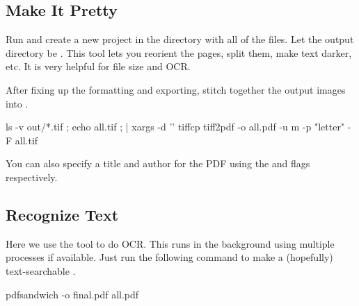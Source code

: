\subsection{Make It Pretty}

Run  and create a new project in the directory with all of the  files.
Let the output directory be .
This tool lets you reorient the pages, split them, make text darker, etc.
It is very helpful for file size and OCR.

After fixing up the formatting and exporting, stitch together the output images into .
\begin{code}
{ ls -v out/*.tif ; echo all.tif ; } | xargs -d '\n' tiffcp
tiff2pdf -o all.pdf -u m -p "letter" -F all.tif
\end{code}
You can also specify a title and author for the PDF using the  and  flags respectively.

\subsection{Recognize Text}

Here we use the  tool to do OCR.
This runs  in the background using multiple processes if available.
Just run the following command to make a (hopefully) text-searchable .
\begin{code}
pdfsandwich -o final.pdf all.pdf
\end{code}



